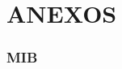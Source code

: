 \part*{ANEXOS}
\section{MIB}
\label{appendix:mib}
\begin{longlisting}
	\inputminted{text}{resources/images/faseA/mib.txt}
\label{listing:a}
\end{longlisting}








